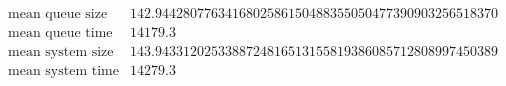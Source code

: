 \[\begin{array}{cc}
 \text{mean queue size} & 142.9442807763416802586150488355050477390903256518370 \\
 \text{mean queue time} & 14179.3 \\
 \text{mean system size} & 143.9433120253388724816513155819386085712808997450389 \\
 \text{mean system time} & 14279.3 \\
\end{array}\]

